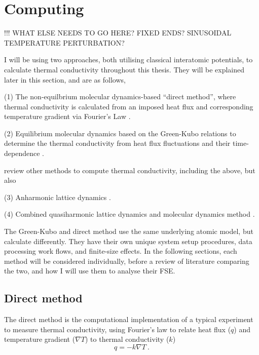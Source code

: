 \pagebreak





\section{Computing \tc}

!!! WHAT ELSE NEEDS TO GO HERE? FIXED ENDS? SINUSOIDAL TEMPERATURE PERTURBATION?

I will be using two approaches, both utilising classical interatomic potentials, to calculate thermal conductivity throughout this thesis. They will be explained later in this section, and are as follows,

(1) The non-equilbrium molecular dynamics-based ``direct method'', where thermal conductivity is calculated from an imposed heat flux and corresponding temperature gradient via Fourier's Law \citep{Muller-Plathe1997,Nieto-Draghi2013}.

(2) Equilibrium molecular dynamics based on the Green-Kubo relations to determine the thermal conductivity from heat flux fluctuations and their time-dependence \citep{Green1954,Kubo1957,Kubo1966,Schelling2002}. 

\citet{Stackhouse2010} review other methods to compute thermal conductivity, including the above, but also

(3) Anharmonic lattice dynamics \citep{Tang2009}. %

(4) Combined quasiharmonic lattice dynamics and molecular dynamics method \citep{DeKoker2009}.

The Green-Kubo and direct method use the same underlying atomic model, but calculate \tcs differently. They have their own unique system setup procedures, data processing work flows, and finite-size effects. In the following sections, each method will be considered individually, before a review of literature comparing the two, and how I will use them to analyse their FSE.



\subsection{Direct method}
The direct method is the computational implementation of a typical experiment to measure thermal conductivity, using Fourier's law to relate heat flux ($q$) and temperature gradient ($\nabla{T}$) to thermal conductivity ($k$)
%
\begin{equation}
q=-k \nabla{T}\ . 
\label{fourier}
\end{equation}

